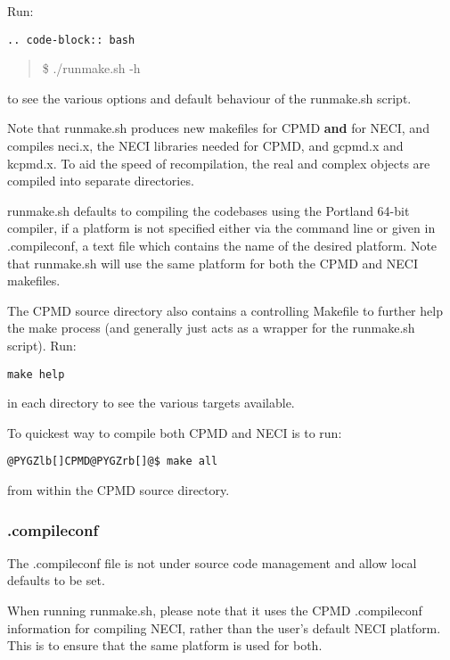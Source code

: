 \documentclass[openany,a4paper,10pt,english]{manual}
\begin{document}
Run:

\begin{Verbatim}[commandchars=@\[\]]
.. code-block:: bash
\end{Verbatim}
\begin{quote}

\$ ./runmake.sh -h
\end{quote}

to see the various options and default behaviour of the runmake.sh script.

Note that runmake.sh produces new makefiles for CPMD \textbf{and} for NECI,
and compiles neci.x, the NECI libraries needed for CPMD, and gcpmd.x
and kcpmd.x.  To aid the speed of recompilation, the real and complex
objects are compiled into separate directories.

runmake.sh defaults to compiling the codebases using the Portland 64-bit
compiler, if a platform is not specified either via the command line or given
in .compileconf, a text file which contains the name of the desired platform.
Note that runmake.sh will use the same platform for both the CPMD and NECI
makefiles.

The CPMD source directory also contains a controlling Makefile
to further help the make process (and generally just acts as a wrapper
for the runmake.sh script).  Run:

\begin{Verbatim}[commandchars=@\[\]]
make help
\end{Verbatim}

in each directory to see the various targets available.

To quickest way to compile both CPMD and NECI is to run:

\begin{Verbatim}[commandchars=@\[\]]
@PYGZlb[]CPMD@PYGZrb[]@$ make all
\end{Verbatim}

from within the CPMD source directory.


\subsubsection{.compileconf}

The .compileconf file is not under source code management and allow local defaults
to be set.

When running runmake.sh, please note that it uses the CPMD .compileconf
information for compiling NECI, rather than the user's default NECI platform.
This is to ensure that the same platform is used for both.
\end{document}
